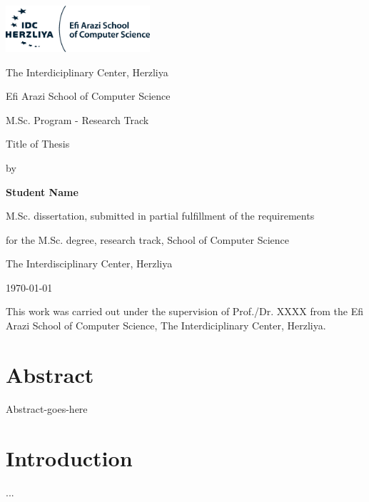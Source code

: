 \documentclass[12pt]{article}
\begin{document}
\begin{titlepage}
	\centering
	\includegraphics[width=0.4\textwidth]{IDC_logo}\par\vspace{2cm}
	{\huge The Interdiciplinary Center, Herzliya \par}
	{\Large Efi Arazi School of Computer Science \par}
	{\Large M.Sc. Program - Research Track \par}
	
	\vspace{1cm}
	
	\vspace{1.5cm}
	{\Huge Title of Thesis\par}
	\vspace{3cm}
	{\large by\par}
	{\large\bfseries Student Name\par}
	
	\vspace{2cm}
	{M.Sc. dissertation, submitted in partial fulfillment of the requirements\par}
	{for the M.Sc. degree, research track, School of Computer Science\par}
	{The Interdisciplinary Center, Herzliya}
	
	\vfill
	
	{\large \monthyeardate\today \par}
	
\end{titlepage}

\newpage

This work was carried out under the supervision of Prof./Dr. XXXX from the Efi Arazi School of Computer Science, The	Interdiciplinary Center, Herzliya.

\newpage

\section*{Abstract}
Abstract-goes-here	


\newpage

\tableofcontents

\newpage

\section{Introduction}
...
\end{document}
